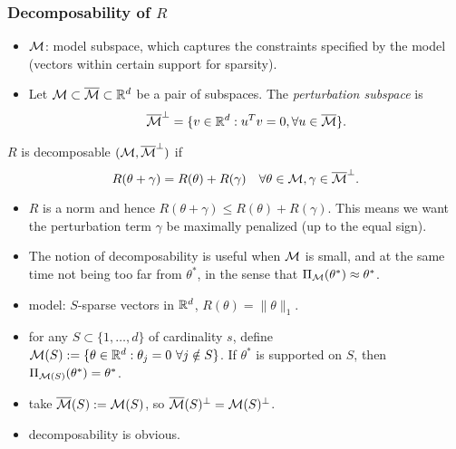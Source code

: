 \subsubsection{Decomposability of $R$}

\begin{itemize}
    \item $\mathcal{M}$: model subspace,
        which captures the constraints specified by the model
        (\eg vectors within certain support for sparsity).
    \item Let $\mathcal{M} \subset {\overline{\mathcal{M}}} \subset {\mathbb{R}}^d$ be a pair of subspaces.
        The \emph{perturbation subspace} is
        \begin{equation}
            {\overline{\mathcal{M}}}^\perp = \{v\in{\mathbb{R}}^d: u^Tv=0, \forall u\in{\overline{\mathcal{M}}}\}.
        \end{equation}
\end{itemize}

\begin{define}
    $R$ is decomposable \wrt $(\mathcal{M}, {\overline{\mathcal{M}}}^\perp)$ if
    \begin{equation}
        R(\theta+\gamma) = R(\theta) + R(\gamma) \quad
        \forall \theta \in \mathcal{M}, \gamma \in {\overline{\mathcal{M}}}^\perp.
    \end{equation}
\end{define}

\begin{obs} \leavevmode
\begin{itemize}
    \item $R$ is a norm and hence
        $R(\theta+\gamma)\le R(\theta) + R(\gamma)$.
        This means we want the perturbation term $\gamma$ be
        maximally penalized (up to the equal sign).
    \item The notion of decomposability is useful when $\mathcal{M}$ is small,
        and at the same time not being too far from $\theta^*$,
        in the sense that $\Pi_{\mathcal{M}}(\theta^*)\approx\theta^*$.
\end{itemize}
\end{obs}

\begin{ex} \leavevmode
\begin{itemize}
    \item model: $S$-sparse vectors in ${\mathbb{R}}^d$, $R(\theta)=\|\theta\|_1$.
    \item for any $S\subset\{1,\dots,d\}$ of cardinality $s$,
        define $\cM(S):=\{\theta\in\real^d:\theta_j=0\ \forall j \notin S \}$.
        If $\theta^*$ is supported on $S$,
        then $\Pi_{\mathcal{M}(S)}(\theta^*)=\theta^*$.
    \item take ${\overline{\mathcal{M}}}(S):=\mathcal{M}(S)$,
        so ${\overline{\mathcal{M}}}(S)^\perp = \mathcal{M}(S)^\perp$.
    \item decomposability is obvious.
\end{itemize}
\end{ex}

